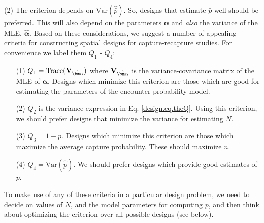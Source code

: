  (2) The criterion depends on $\mbox{Var}(\hat{\bar{p}})$. So, designs
 that estimate $\bar{p}$ well should be preferred.  This will also
 depend on the parameters ${\bm \alpha}$ and {\it also} the variance
 of the MLE, $\hat{\bm \alpha}$. 
 Based on these considerations, 
we suggest a number of appealing criteria for constructing spatial
designs for capture-recapture studies.
For convenience we label them $Q_{1}$ - $Q_{4}$:
\begin{itemize}
\item[(1)] $Q_{1} = \mbox{Trace}({\bf V}_{\hat{\bm \alpha}})$ where ${\bf
    V}_{\hat{\bm \alpha}}$ is the variance-covariance matrix of the
  MLE of ${\bm \alpha}$. Designs which minimize this criterion
  are those which are good for estimating the parameters of the
  encounter probability model. 
\item[(2)] $Q_{2}$ is the variance expression in
  Eq. \ref{design.eq.theQ}. Using this criterion, we should prefer designs that minimize
  the variance for estimating $N$.
\item[(3)] $Q_{3} = 1-\bar{p}$. Designs which minimize this criterion
  are those which maximize the average capture probability. These
  should maximize $n$.
\item[(4)] $Q_{4} = \mbox{Var}(\hat{\bar{p}})$. We should prefer
  designs which provide good estimates of $\bar{p}$. 
\end{itemize}
To make use of any of these criteria in a particular design problem, we need
to decide on values of $N$, and the model parameters for computing
$\bar{p}$, and then think about optimizing the criterion over all
possible designs (see below).

